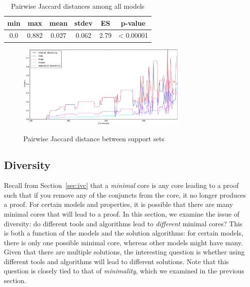 \begin{table}
  \centering
  \begin{tabular}{ |c|c|c|c|c|c| }
    \hline
     min & max & mean & stdev & ES & p-value\\[0.5ex]
    \hline
     0.0   & 0.882 & 0.027 & 0.062 & 2.79 & < 0.00001 \\[0.5ex]
    \hline
  \end{tabular}
  \caption{Pairwise Jaccard distances among all models}
  \label{tab:jaccard-avg}
\end{table}

\begin{figure}
  \centering
  \includegraphics[width=0.75\textwidth]{figs/jacdis2.png} \\ 
  \caption{Pairwise Jaccard distance between support sets}\label{fig:jacdis}
\end{figure}

\subsection{Diversity}
\label{sec:diversity}
Recall from Section~\ref{sec:ivc} that a {\em minimal} core is any core leading to a proof such that if you remove any of the conjuncts from the core, it no longer produces a proof.  For certain models and properties, it is possible that there are many minimal cores that will lead to a proof.  In this section, we examine the issue of diversity: do different tools and algorithms lead to {\em different} minimal cores?  This is both a function of the models and the solution algorithms: for certain models, there is only one possible minimal core, whereas other models might have many. Given that there are multiple solutions, the interesting question is whether using different tools and algorithms will lead to different solutions.  Note that this question is closely tied to that of {\em minimality}, which we examined in the previous section.

